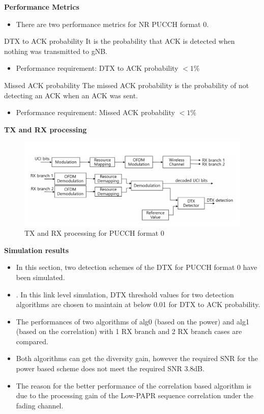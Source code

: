 \documentclass{beamer}
\begin{document}
\begin{frame}{\textbf{Performance Metrics}}
\begin{itemize}
    \item There are two performance metrics for NR PUCCH format 0.
\end{itemize}
\begin{block}{DTX to ACK probability}
It is the probability that ACK is detected when nothing was transmitted to gNB.
\begin{itemize}
\item Performance requirement: DTX to ACK probability $ < 1\%$
\end{itemize}
\end{block}
\begin{block}{Missed ACK probability}
 The  missed ACK probability is the probability of not detecting an ACK when an ACK was sent.
\begin{itemize}
\item Performance requirement: Missed ACK probability $ < 1\%$
\end{itemize}
\end{block}
\end{frame}
\begin{frame}{\textbf{TX and RX processing}}
    \begin{figure}
        \centering
        \includegraphics[scale=0.3]{TX_RX.png}
        \caption{TX and RX processing for PUCCH format 0}
       
    \end{figure}
\end{frame}
\begin{frame}{\textbf{Simulation results}}
\begin{itemize}
    \item In this section, two detection schemes of the DTX for PUCCH format 0 have been simulated.
    \item . In this link level simulation, DTX
threshold values for two detection algorithms are chosen to maintain at below 0.01 for DTX to ACK probability.
\item The performances
of two algorithms of alg0 (based on the power) and alg1 (based on the correlation) with 1 RX branch and 2 RX branch cases are compared.
\item  Both algorithms can get the
diversity gain, however the required SNR for the power based scheme does not meet the required SNR 3.8dB.
\item The reason for the better performance of the correlation based algorithm is due to the processing gain of the Low-PAPR sequence correlation under the fading channel.
\end{itemize}
    
\end{frame}
\end{document}
